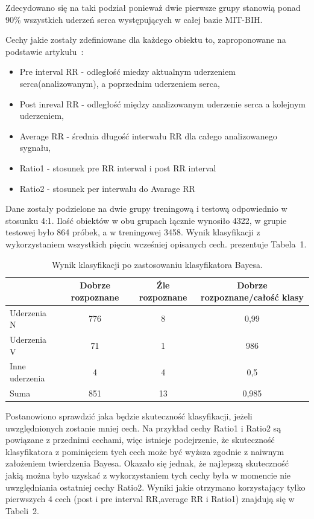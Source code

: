 \documentclass[[10pt,a4paper]{article}
\begin{document}
Zdecydowano się na taki podział ponieważ dwie pierwsze grupy stanowią ponad 90\% wszystkich uderzeń serca występujących w całej bazie MIT-BIH.

\vspace{0.5cm}
Cechy jakie zostały zdefiniowane dla każdego obiektu to, zaproponowane na podstawie artykułu~\cite{1}:
\begin{itemize}
\item Pre interval RR - odległość miedzy aktualnym uderzeniem serca(analizowanym), a poprzednim uderzeniem serca,
\item Post inreval RR  - odległość między analizowanym uderzenie serca a kolejnym uderzeniem,
\item Average RR - średnia długość interwału RR dla całego analizowanego sygnału,
\item Ratio1 - stosunek pre RR interwal i post RR interval
\item Ratio2 - stosunek per interwalu do Avarage RR 
\end{itemize}

Dane zostały podzielone na dwie grupy treningową i testową odpowiednio w stosunku 4:1. Ilość obiektów w obu grupach łącznie wynosiło 4322, w grupie testowej było 864 próbek, a w treningowej 3458. Wynik klasyfikacji z wykorzystaniem wszystkich pięciu wcześniej opisanych cech. prezentuje Tabela~1.

\begin{table}[h]
\centering
\caption{Wynik klasyfikacji po zastosowaniu klasyfikatora Bayesa.}
    \begin{tabular}
{|l|c|c|c|}
    \hline
    ~              & Dobrze rozpoznane & Źle rozpoznane &  Dobrze rozpoznane/całość klasy \\ \hline
    Uderzenia N    & 776                      & 8                          & 0,99                     \\ \hline
    Uderzenia V    & 71                        & 1                          & 986                         \\ \hline
    Inne uderzenia & 4                       & 4                           & 0,5                     \\ \hline
    Suma           & 851                      & 13                          & 0,985                     \\ \hline
    \end{tabular}
\end{table}
 
Postanowiono sprawdzić jaka będzie skuteczność klasyfikacji, jeżeli uwzględnionych zostanie mniej cech. Na przykład cechy Ratio1 i Ratio2 są powiązane z przednimi cechami, więc istnieje podejrzenie, że skuteczność klasyfikatora z pominięciem tych cech może być wyższa zgodnie z naiwnym założeniem twierdzenia Bayesa. Okazało się jednak, że najlepszą skuteczność jakią można było uzyskać z wykorzystaniem tych cechy była w momencie nie uwzględniania ostatniej cechy Ratio2. Wyniki jakie otrzymano korzystający tylko pierwszych 4 cech (post i pre interval RR,average RR i Ratio1) znajdują się w Tabeli~2. 
\end{document}
